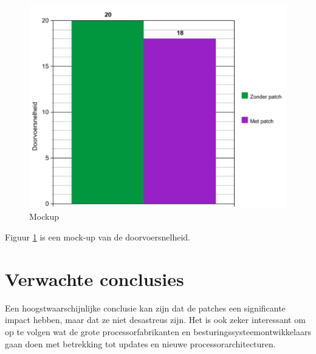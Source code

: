 \begin{figure}
	\includegraphics[width=1.0\linewidth]{../voorstel/voorstel.png}
	\caption{Mockup}
	\label{fig:voorstel}
\end{figure}

Figuur \ref{fig:voorstel} is een mock-up van de doorvoersnelheid.



\section{Verwachte conclusies}
\label{sec:verwachte_conclusies}


Een hoogstwaarschijnlijke conclusie kan zijn dat de patches een significante impact hebben, maar dat ze niet desastreus zijn. Het is ook zeker interessant om op te volgen wat de grote processorfabrikanten en besturingssysteemontwikkelaars gaan doen met betrekking tot updates en nieuwe processorarchitecturen.